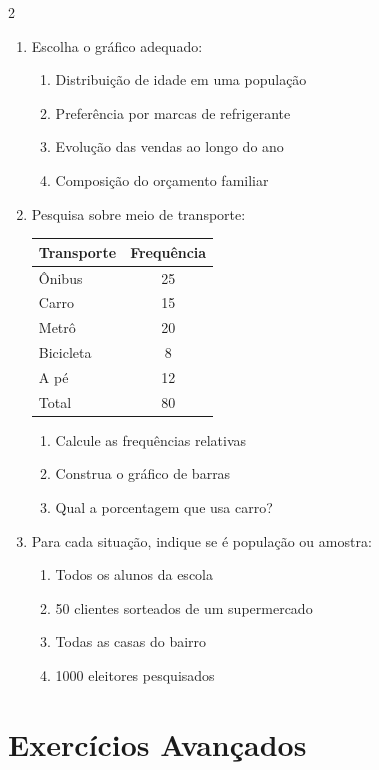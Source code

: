 \documentclass[11pt]{article}
\begin{document}
\begin{multicols}{2}
\begin{enumerate}[leftmargin=*]
\item Escolha o gráfico adequado:
\begin{enumerate}[label=\alph*)]
\item Distribuição de idade em uma população
\item Preferência por marcas de refrigerante
\item Evolução das vendas ao longo do ano
\item Composição do orçamento familiar
\end{enumerate}

\item Pesquisa sobre meio de transporte:
\begin{center}
\begin{tabular}{|l|c|}
\hline
\textbf{Transporte} & \textbf{Frequência} \\
\hline
Ônibus & 25 \\
Carro & 15 \\
Metrô & 20 \\
Bicicleta & 8 \\
A pé & 12 \\
\hline
Total & 80 \\
\hline
\end{tabular}
\end{center}
\begin{enumerate}[label=\alph*)]
\item Calcule as frequências relativas
\item Construa o gráfico de barras
\item Qual a porcentagem que usa carro?
\end{enumerate}

\item Para cada situação, indique se é população ou amostra:
\begin{enumerate}[label=\alph*)]
\item Todos os alunos da escola
\item 50 clientes sorteados de um supermercado
\item Todas as casas do bairro
\item 1000 eleitores pesquisados
\end{enumerate}

\end{enumerate}

\section*{Exercícios Avançados}


\end{multicols}
\end{document}
